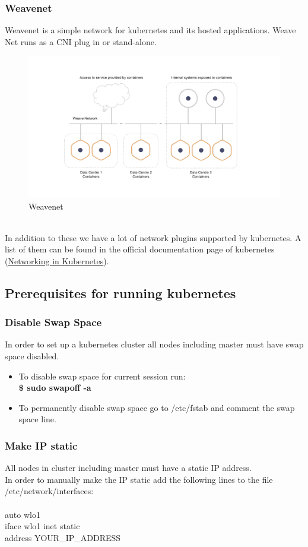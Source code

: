 \documentclass[12pt]{article}
\begin{document}
\subsubsection{Weavenet}
Weavenet is a simple network for kubernetes and its hosted applications. Weave Net runs as a CNI plug in or stand-alone.
\begin{figure}[h!]
	\begin{center}
		\includegraphics[totalheight=0.3\textheight]{weavenet}
		\caption{Weavenet}
	\end{center}
\end{figure}
\\In addition to these we have a lot of network plugins supported by kubernetes. A list of them can be found in the official documentation page of kubernetes (\href{https://kubernetes.io/docs/concepts/cluster-administration/networking/}{Networking in Kubernetes}).
\subsection{Prerequisites for running kubernetes \cite{Prereq}}
\subsubsection{Disable Swap Space}
In order to set up a kubernetes cluster all nodes including master must have swap space disabled.
\begin{itemize}
	\item To disable swap space for current session run: \\
		  \textbf{\$ sudo swapoff -a}
	\item To permanently disable swap space go to /etc/fstab and comment the swap space line.
\end{itemize}
\subsubsection{Make IP static}
All nodes in cluster including master must have a static IP address.\\
In order to manually make the IP static add the following lines to the file /etc/network/interfaces:\\\\
auto wlo1\\
iface wlo1 inet static\\
address  YOUR\_IP\_ADDRESS
\end{document}
